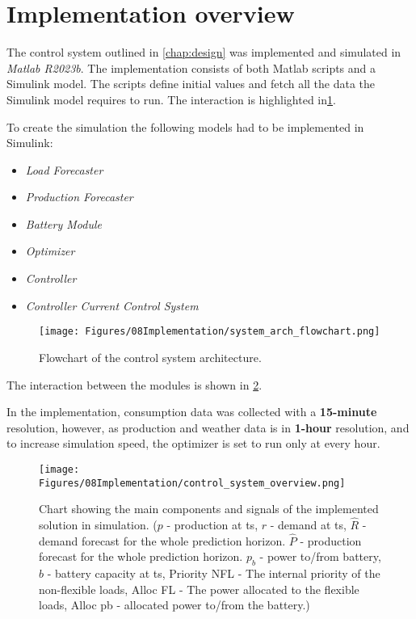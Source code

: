 \section{Implementation overview}

The control system outlined in \ref{chap:design} was implemented and simulated in \textit{Matlab R2023b}\cite{MATLAB}. The implementation consists of both Matlab scripts and a Simulink model. The scripts define initial values and fetch all the data the Simulink model requires to run. The interaction is highlighted in\ref{fig:system_arch_flowchart}.

To create the simulation the following models had to be implemented in Simulink:
\begin{itemize}
    \item \textit{Load Forecaster}
    \item \textit{Production Forecaster}
    \item \textit{Battery Module}
    \item \textit{Optimizer}
    \item \textit{Controller}
    \item \textit{Controller Current Control System}
\end{itemize}

\begin{figure}
    \centering
    \texttt{[image: Figures/08Implementation/system\_arch\_flowchart.png]}
    \caption[Control System architecture flowchart]{Flowchart of the control system architecture.}
    \label{fig:system_arch_flowchart}
\end{figure}


The interaction between the modules is shown in \ref{fig:control_system_block_chart}.

In the implementation, consumption data was collected with a \textbf{15-minute} resolution, however, as production and weather data is in \textbf{1-hour} resolution, and to increase simulation speed, the optimizer is set to run only at every hour. 

\begin{figure}
    \centering
    \texttt{[image: Figures/08Implementation/control\_system\_overview.png]}
    \caption[Proposed control system block chart]{Chart showing the main components and signals of the implemented solution in simulation. ($p$ - production at ts, $r$ - demand at ts, $\hat{R}$ - demand forecast for the whole prediction horizon. $\hat{P}$ - production forecast for the whole prediction horizon. $p_b$ - power to/from battery, $b$ - battery capacity at ts, Priority NFL - The internal priority of the non-flexible loads, Alloc FL - The power allocated to the flexible loads, Alloc pb - allocated power to/from the battery.)}
    \label{fig:control_system_block_chart}
\end{figure}

